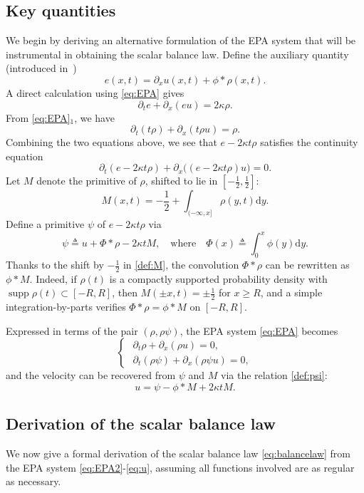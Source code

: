 \documentclass[11pt,reqno]{amsart}
\theoremstyle{definition}
\theoremstyle{remark}
\def\dd{\mathrm{d}}
\def\pa{\partial}
\DeclareMathOperator{\supp}{supp}
\begin{document}
	\subsection{Key quantities}
	We begin by deriving an alternative formulation of the EPA system that will be instrumental in obtaining the scalar balance law. Define the auxiliary quantity (introduced in~\cite{carrillo2016critical})
	\[
	e(x,t) = \pa_x u(x,t) + \phi*\rho(x,t).
	\]
	A direct calculation using \eqref{eq:EPA} gives
	\[
	\pa_te +\pa_x(eu) = 2\kappa\rho.
	\]
	From \eqref{eq:EPA}$_1$, we have
	\[
	\pa_t(t\rho) + \pa_x(t\rho u) = \rho.
	\]
	Combining the two equations above, we see that $e-2\kappa t\rho$ satisfies the continuity equation
	\[
	\pa_t(e-2\kappa t\rho) + \pa_x\big((e-2\kappa t\rho)u\big) = 0.
	\]
	Let $M$ denote the primitive of $\rho$, shifted to lie in $[-\tfrac12,\tfrac12]$:
	\begin{equation}\label{def:M}
		M(x,t) = - \frac12 + \int_{(-\infty,x]} \rho(y,t)\dd y.	
	\end{equation}
	Define a primitive $\psi$ of $e-2\kappa t \rho$ via 
	\begin{equation}\label{def:psi}
		\psi \triangleq u + \Phi\ast\rho - 2\kappa t M,\quad \text{where}\quad \Phi(x) \triangleq \int_0^x \phi(y)\dd y.
	\end{equation}
	Thanks to the shift by $-\frac12$ in \eqref{def:M}, the convolution $\Phi\ast\rho$ can be rewritten as $\phi\ast M$.  Indeed, if $\rho(t)$ is a compactly supported probability density with $\supp\rho(t)\subset[-R,R]$, then $M(\pm x,t)=\pm\tfrac12$ for $x\ge R$, and a simple integration-by-parts verifies $\Phi*\rho=\phi*M$ on $[-R,R]$.
	
	Expressed in terms of the pair $(\rho,\rho\psi)$, the EPA system \eqref{eq:EPA} becomes
	\begin{equation}\label{eq:EPA2}
		\begin{cases}
			\,\,\pa_t \rho + \pa_x (\rho u) = 0, \\
			\,\,\pa_t (\rho \psi) + \pa_x (\rho \psi u) = 0,
		\end{cases}  
	\end{equation}
	and the velocity can be recovered from $\psi$ and $M$ via the relation \eqref{def:psi}:
	\begin{equation}
		\label{eq:u}
		u = \psi - \phi\ast M + 2\kappa tM.
	\end{equation}
	
	\subsection{Derivation of the scalar balance law}
	We now give a formal derivation of the scalar balance law \eqref{eq:balancelaw} from the EPA system \eqref{eq:EPA2}-\eqref{eq:u}, assuming all functions involved are as regular as necessary. 
	
\end{document}
